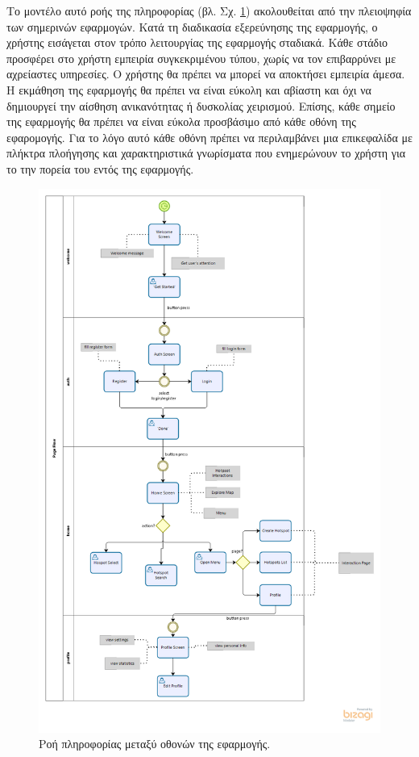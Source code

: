 Το μοντέλο αυτό ροής της πληροφορίας (βλ. Σχ. \ref{pageflow}) ακολουθείται από την πλειοψηφία των σημερινών εφαρμογών. Κατά τη διαδικασία εξερεύνησης της εφαρμογής, ο χρήστης εισάγεται στον τρόπο λειτουργίας της εφαρμογής σταδιακά. Κάθε στάδιο προσφέρει στο χρήστη εμπειρία συγκεκριμένου τύπου, χωρίς να τον επιβαρρύνει με αχρείαστες υπηρεσίες. Ο χρήστης θα πρέπει να μπορεί να αποκτήσει εμπειρία άμεσα. Η εκμάθηση της εφαρμογής θα πρέπει να είναι εύκολη και αβίαστη και όχι να δημιουργεί την αίσθηση ανικανότητας ή δυσκολίας χειρισμού. \newline
\indent
Επίσης, κάθε σημείο της εφαρμογής θα πρέπει να είναι εύκολα προσβάσιμο από κάθε οθόνη της εφαρομογής. Για το λόγο αυτό κάθε οθόνη πρέπει να περιλαμβάνει μια επικεφαλίδα με πλήκτρα πλοήγησης και χαρακτηριστικά γνωρίσματα που ενημερώνουν το χρήστη για το την πορεία του εντός της εφαρμογής.


\begin{figure}[H]
    \centering
    \includegraphics[scale=0.6]{figures/page-flow.png}
    \caption{Ροή πληροφορίας μεταξύ οθονών της εφαρμογής.}
    \label{pageflow}
\end{figure}



